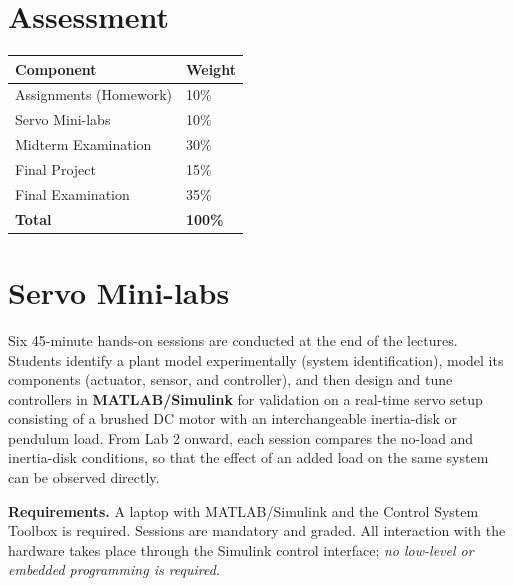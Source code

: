 \documentclass[11pt]{article}
\newcommand{\callout}[1]{%
  \par\vspace{4pt}%
  \noindent\colorbox{boxbg}{%
    \begin{minipage}{\dimexpr\textwidth-2\fboxsep\relax}
      \vspace{4pt}#1\vspace{4pt}
    \end{minipage}}%
  \par\vspace{6pt}}
\begin{document}
\newpage
\section{Assessment}
\begin{center}
\begin{tabular}{@{}L{9cm} C{2cm}@{}}
\toprule
\textbf{Component} & \textbf{Weight} \\
\midrule
Assignments (Homework)      & 10\% \\
Servo Mini-labs             & 10\% \\
Midterm Examination         & 30\% \\
Final Project               & 15\% \\
Final Examination           & 35\% \\
\midrule
\textbf{Total}              & \textbf{100\%} \\
\bottomrule
\end{tabular}
\end{center}


\section{Servo Mini-labs}
Six 45-minute hands-on sessions are conducted at the end of the lectures. Students
identify a plant model experimentally (system identification), model its components
(actuator, sensor, and controller), and then design and tune controllers in
\textbf{MATLAB/Simulink} for validation on a real-time servo setup consisting of a
brushed DC motor with an interchangeable inertia-disk or pendulum load. From Lab 2
onward, each session compares the no-load and inertia-disk conditions, so that the
effect of an added load on the same system can be observed directly.

\callout{\textbf{Requirements.} A laptop with MATLAB/Simulink and the Control System
Toolbox is required. Sessions are mandatory and graded. All interaction with the
hardware takes place through the Simulink control interface;
\emph{no low-level or embedded programming is required}.}
\end{document}
